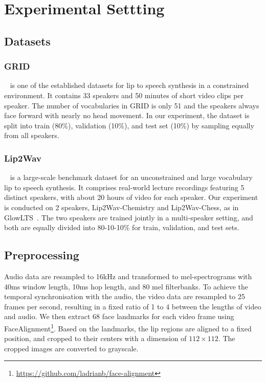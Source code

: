\documentclass[letterpaper]{article} %
\begin{document}
\section{Experimental Settting}
\subsection{Datasets}
\subsubsection{GRID}~\cite{cooke2006audio} is one of the established datasets for lip to speech synthesis in a constrained environment.
It contains 33 speakers and 50 minutes of short video clips per speaker.
The number of vocabularies in GRID is only 51 and the speakers always face forward with nearly no head movement.
In our experiment, the dataset is split into train (80\%), validation (10\%), and test set (10\%) by sampling equally from all speakers.

\subsubsection{Lip2Wav}~\cite{prajwal2020learning} is a large-scale benchmark dataset for an unconstrained and large vocabulary lip to speech synthesis. It comprises real-world lecture recordings featuring 5 distinct speakers, with about 20 hours of video for each speaker. Our experiment is conducted on 2 speakers, Lip2Wav-Chemistry and Lip2Wav-Chess, as in GlowLTS~\cite{he2022flow}. The two speakers are trained jointly in a multi-speaker setting, and both are equally divided into 80-10-10\% for train, validation, and test sets.

\subsection{Preprocessing}
Audio data are resampled to 16kHz and transformed to mel-spectrograms with 40ms window length, 10ms hop length, and 80 mel filterbanks.
To achieve the temporal synchronisation with the audio, the video data are resampled to 25 frames per second, resulting in a fixed ratio of 1 to 4 between the lengths of video and audio.
We then extract 68 face landmarks for each video frame using FaceAlignment\footnote{\url{https://github.com/ladrianb/face-alignment}}.
Based on the landmarks, the lip regions are aligned to a fixed position, and cropped to their centers with a dimension of $112 \times 112$.
The cropped images are converted to grayscale.
\end{document}
